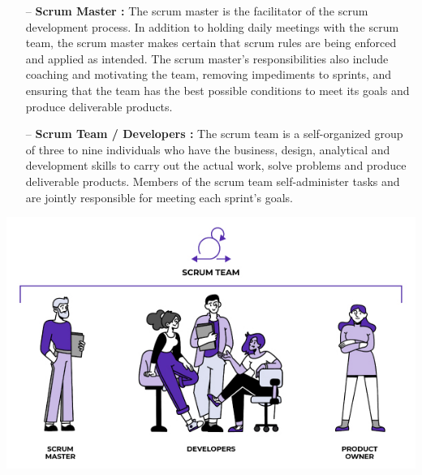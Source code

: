 \documentclass{report}
\begin{document}
\begin{itemize}
    \item[--]\textbf{\normalsize Scrum Master :} \textnormal{The scrum master is the facilitator of the scrum development process. In addition to holding daily meetings with the scrum team, the scrum master makes certain that scrum rules are being enforced and applied as intended. The scrum master’s responsibilities also include coaching and motivating the team, removing impediments to sprints, and ensuring that the team has the best possible conditions to meet its goals and produce deliverable products.}
\end{itemize}

\begin{itemize}
    \item[--]\textbf{\normalsize Scrum Team / Developers :} \textnormal{The scrum team is a self-organized group of three to nine individuals who have the business, design, analytical and development skills to carry out the actual work, solve problems and produce deliverable products. Members of the scrum team self-administer tasks and are jointly responsible for meeting each sprint’s goals.}
\end{itemize}
\begin{center}
 \includegraphics[scale=0.4]{images/roles.jpg}
\end{center}
\end{document}
